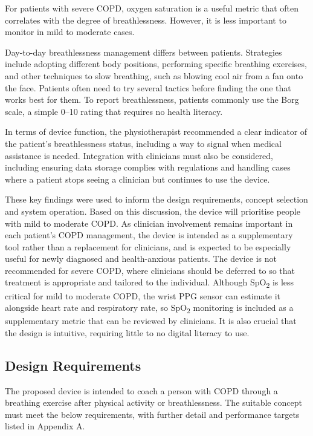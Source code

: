 For patients with severe COPD, oxygen saturation is a useful metric that often correlates with the degree of breathlessness. However, it is less important to monitor in mild to moderate cases.

Day-to-day breathlessness management differs between patients. Strategies include adopting different body positions, performing specific breathing exercises, and other techniques to slow breathing, such as blowing cool air from a fan onto the face. Patients often need to try several tactics before finding the one that works best for them. To report breathlessness, patients commonly use the Borg scale, a simple 0--10 rating that requires no health literacy.

In terms of device function, the physiotherapist recommended a clear indicator of the patient's breathlessness status, including a way to signal when medical assistance is needed. Integration with clinicians must also be considered, including ensuring data storage complies with regulations and handling cases where a patient stops seeing a clinician but continues to use the device.

These key findings were used to inform the design requirements, concept selection and system operation. Based on this discussion, the device will prioritise people with mild to moderate COPD. As clinician involvement remains important in each patient's COPD management, the device is intended as a supplementary tool rather than a replacement for clinicians, and is expected to be especially useful for newly diagnosed and health-anxious patients. The device is not recommended for severe COPD, where clinicians should be deferred to so that treatment is appropriate and tailored to the individual. Although SpO\textsubscript{2} is less critical for mild to moderate COPD, the wrist PPG sensor can estimate it alongside heart rate and respiratory rate, so SpO\textsubscript{2} monitoring is included as a supplementary metric that can be reviewed by clinicians. It is also crucial that the design is intuitive, requiring little to no digital literacy to use.

\subsection{Design Requirements}
The proposed device is intended to coach a person with COPD through a breathing exercise after physical activity or breathlessness. The suitable concept must meet the below requirements, with further detail and performance targets listed in Appendix A.

